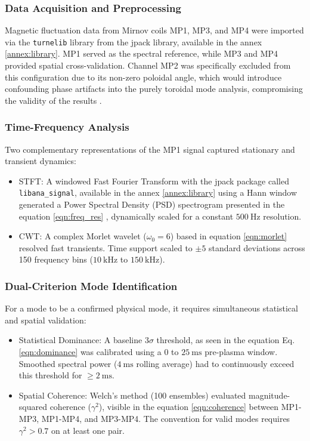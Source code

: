 \subsubsection{Data Acquisition and Preprocessing}
Magnetic fluctuation data from Mirnov coils MP1, MP3, and MP4 were imported via the \texttt{turnelib} library from the jpack library, available in the annex \ref{annex:library}. MP1 served as the spectral reference, while MP3 and MP4 provided spatial cross-validation. Channel MP2 was specifically excluded from this configuration due to its non-zero poloidal angle, which would introduce confounding phase artifacts into the purely toroidal mode analysis, compromising the validity of the results \cite{Seo2019TheEO,schittenhelm1997analysis}.

\subsubsection{Time-Frequency Analysis}
Two complementary representations of the MP1 signal captured stationary and transient dynamics:
\begin{itemize}
    \item STFT: A windowed Fast Fourier Transform with the jpack package called \texttt{libana\_signal}, available in the annex \ref{annex:library} using a Hann window generated a Power Spectral Density (PSD) spectrogram presented in the equation \ref{eqn:freq_res} \cite{proakis2021digital}, dynamically scaled for a constant $500~\mathrm{Hz}$ resolution.
    \item CWT: A complex Morlet wavelet ($\omega_0 = 6$) based in equation \ref{eqn:morlet} \cite{boashash2015time, addison2016illustrated} resolved fast transients. Time support scaled to $\pm 5$ standard deviations across 150 frequency bins ($10~\mathrm{kHz}$ to $150~\mathrm{kHz}$).
\end{itemize}



\subsubsection{Dual-Criterion Mode Identification}
For a mode to be a confirmed physical mode, it requires simultaneous statistical and spatial validation:
\begin{itemize}
    \item Statistical Dominance: A baseline $3\sigma$ threshold, as seen in the equation Eq. \ref{eqn:dominance} \cite{Edlund2018} was calibrated using a $0$ to $25~\mathrm{ms}$ pre-plasma window. Smoothed spectral power ($4~\mathrm{ms}$ rolling average) had to continuously exceed this threshold for $\geq 2~\mathrm{ms}$.
    \item Spatial Coherence: Welch's method (100 ensembles) evaluated magnitude-squared coherence ($\gamma^2$), visible in the equation \ref{eqn:coherence} \cite{KraemerFlecken2024, Singh2024} between MP1-MP3, MP1-MP4, and MP3-MP4. The convention for valid modes requires $\gamma^2 > 0.7$ on at least one pair.
\end{itemize}



